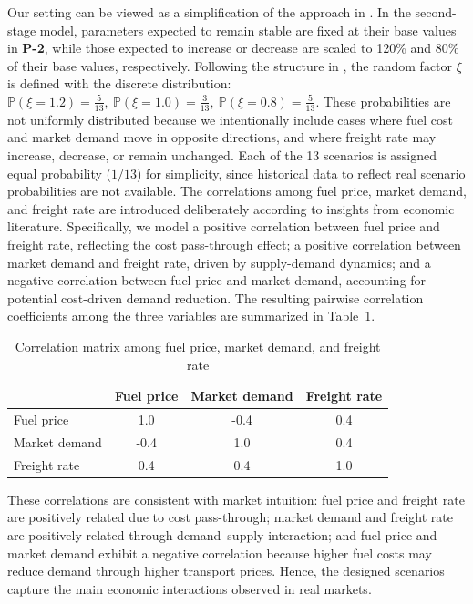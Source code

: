\documentclass[11pt,english]{article}
\begin{document}
Our setting can be viewed as a simplification of the approach in \cite{wang2018planning}. In the second-stage model, parameters expected to remain stable are fixed at their base values in \textbf{P-2}, while those expected to increase or decrease are scaled to 120\% and 80\% of their base values, respectively. Following the structure in \cite{wang2018planning}, the random factor $\xi$ is defined with the discrete distribution: $\mathbb{P}(\xi = 1.2) = \tfrac{5}{13},\ \mathbb{P}(\xi = 1.0) = \tfrac{3}{13},\ \mathbb{P}(\xi = 0.8) = \tfrac{5}{13}$. These probabilities are not uniformly distributed because we intentionally include cases where fuel cost and market demand move in opposite directions, and where freight rate may increase, decrease, or remain unchanged. Each of the 13 scenarios is assigned equal probability ($1/13$) for simplicity, since historical data to reflect real scenario probabilities are not available. The correlations among fuel price, market demand, and freight rate are introduced deliberately according to insights from economic literature. Specifically, we model a positive correlation between fuel price and freight rate, reflecting the cost pass-through effect; a positive correlation between market demand and freight rate, driven by supply-demand dynamics; and a negative correlation between fuel price and market demand, accounting for potential cost-driven demand reduction. The resulting pairwise correlation coefficients among the three variables are summarized in Table~\ref{tab:A1}.

\begin{table}[!ht]
    \centering
    \caption{Correlation matrix among fuel price, market demand, and freight rate}
    \label{tab:A1}
    \begin{tabular}{lccc}
        \toprule
        & Fuel price & Market demand & Freight rate \\
        \midrule
        Fuel price    & 1.0 & -0.4 & 0.4 \\
        Market demand & -0.4 & 1.0 & 0.4 \\
        Freight rate  & 0.4 & 0.4 & 1.0 \\
        \bottomrule
    \end{tabular}
\end{table}

These correlations are consistent with market intuition: fuel price and freight rate are positively related due to cost pass-through; market demand and freight rate are positively related through demand–supply interaction; and fuel price and market demand exhibit a negative correlation because higher fuel costs may reduce demand through higher transport prices. Hence, the designed scenarios capture the main economic interactions observed in real markets.
\end{document}
